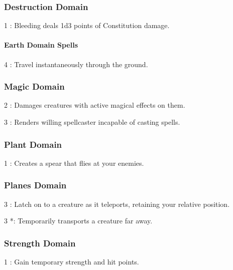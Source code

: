 \subsubsection{Destruction Domain}
\begin{list}{}{\leftmargin=1em}
 \item[1] : Bleeding deals 1d3 points of Constitution damage.
\end{list}
\paragraph{Earth Domain Spells}
\begin{list}{}{\leftmargin=1em}
 \item[4] : Travel instantaneously through the ground.
\end{list}
\subsubsection{Magic Domain}
\begin{list}{}{\leftmargin=1em}
 \item[2] : Damages creatures with active magical effects on them.
 \item[3] : Renders willing spellcaster incapable of casting spells.
\end{list}
\subsubsection{Plant Domain}
\begin{list}{}{\leftmargin=1em}
 \item[1] : Creates a spear that flies at your enemies.
\end{list}
\subsubsection{Planes Domain}
\begin{list}{}{\leftmargin=1em}
 \item[3] : Latch on to a creature as it teleports, retaining your relative position.
 \item[3] *: Temporarily transports a creature far away.
\end{list}
\subsubsection{Strength Domain}
\begin{list}{}{\leftmargin=1em}
 \item[1] : Gain temporary strength and hit points.
\end{list}
